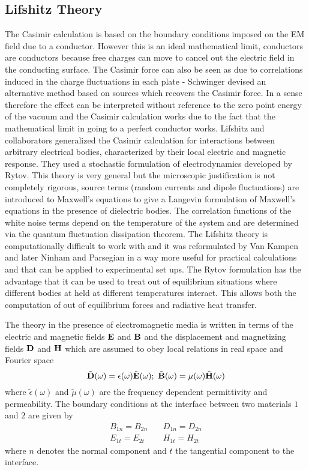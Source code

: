 \subsection{Lifshitz Theory}
The Casimir calculation is based on the boundary conditions imposed on the EM field 
due to a conductor. However this is an ideal mathematical limit, conductors are conductors because free charges can move to cancel out the electric field in the conducting surface.
The Casimir force can also be seen as due to correlations induced in the charge fluctuations in each plate - Schwinger devised an alternative method based on sources which recovers the Casimir force. In a sense therefore the effect can be interpreted without reference to
the zero point energy of the vacuum and the Casimir calculation works due to the fact that the mathematical limit in going to a perfect conductor works. Lifshitz and collaborators 
generalized the Casimir calculation for interactions between arbitrary electrical bodies, characterized by their local electric and magnetic response. They used a stochastic formulation of electrodynamics developed by Rytov. This theory is very general but the microscopic justification is not completely rigorous, source terms (random currents and 
dipole fluctuations) are introduced to Maxwell's equations to give a Langevin formulation
of Maxwell's equations in the presence of dielectric bodies. The correlation functions of
the white noise terms depend on the temperature of the system and are determined via the 
quantum fluctuation dissipation theorem. The Lifshitz theory is computationally difficult to work with and it was reformulated by Van Kampen and later Ninham and Parsegian in a 
way more useful for practical calculations and that can be applied to experimental set ups.
The Rytov formulation has the advantage that it can be used to treat out of equilibrium situations where different bodies at held at different temperatures interact. This allows both the  computation of out of equilibrium forces and radiative  heat transfer. 

The theory in the presence of electromagnetic media is written in terms of the electric and magnetic fields ${\bf E}$ and ${\bf B}$ and the displacement and magnetizing fields ${\bf D}$ and ${\bf H}$ which are assumed to obey local relations in real space and Fourier space
\begin{equation}
\tilde {\bf D}(\omega)=\epsilon(\omega)\tilde{\bf E}(\omega); \ \tilde {\bf B}(\omega)= \mu(\omega) \tilde{\bf H}(\omega)
\end{equation}
where $\tilde\epsilon( \omega)$ and $\tilde\mu( \omega)$ are the frequency dependent
permittivity and permeability. The boundary conditions at the interface between two materials $1$ and $2$ are given by
\begin{eqnarray}
B_{1n}= B_{2n} && \ D_{1n}=D_{2n} \\
E_{1t} = E_{2t}  && \ H_{1t}=H_{2t}
\end{eqnarray}
where $n$ denotes the normal component and $t$ the tangential component to the interface.

